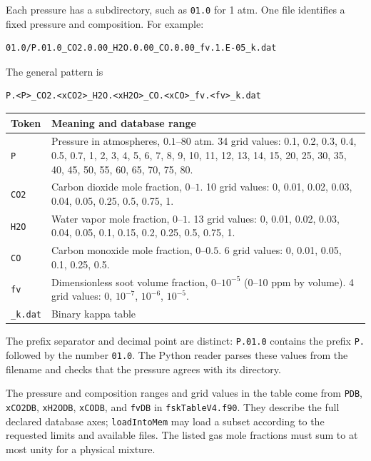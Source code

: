 \documentclass[11pt,letterpaper]{article}
\begin{document}
Each pressure has a subdirectory, such as \texttt{01.0} for 1 atm.
One file identifies a fixed pressure and composition. For example:
\begin{lstlisting}
01.0/P.01.0_CO2.0.00_H2O.0.00_CO.0.00_fv.1.E-05_k.dat
\end{lstlisting}
The general pattern is
\begin{lstlisting}
P.<P>_CO2.<xCO2>_H2O.<xH2O>_CO.<xCO>_fv.<fv>_k.dat
\end{lstlisting}
\begin{center}
\begin{tabularx}{\linewidth}{@{}l X@{}}
\toprule
Token & Meaning and database range \\
\midrule
\texttt{P} & Pressure in atmospheres, $0.1$--$80$ atm.
34 grid values: 0.1, 0.2, 0.3, 0.4, 0.5, 0.7, 1, 2, 3, 4, 5, 6, 7,
8, 9, 10, 11, 12, 13, 14, 15, 20, 25, 30, 35, 40, 45, 50, 55, 60,
65, 70, 75, 80. \\
\addlinespace
\texttt{CO2} & Carbon dioxide mole fraction, $0$--$1$.
10 grid values: 0, 0.01, 0.02, 0.03, 0.04, 0.05, 0.25, 0.5, 0.75, 1. \\
\addlinespace
\texttt{H2O} & Water vapor mole fraction, $0$--$1$.
13 grid values: 0, 0.01, 0.02, 0.03, 0.04, 0.05, 0.1, 0.15, 0.2, 0.25,
0.5, 0.75, 1. \\
\addlinespace
\texttt{CO} & Carbon monoxide mole fraction, $0$--$0.5$.
6 grid values: 0, 0.01, 0.05, 0.1, 0.25, 0.5. \\
\addlinespace
\texttt{fv} & Dimensionless soot volume fraction,
$0$--$10^{-5}$ (0--10 ppm by volume).
4 grid values: $0$, $10^{-7}$, $10^{-6}$, $10^{-5}$. \\
\addlinespace
\texttt{\_k.dat} & Binary kappa table \\
\bottomrule
\end{tabularx}
\end{center}
The prefix separator and decimal point are distinct: \texttt{P.01.0}
contains the prefix \texttt{P.} followed by the number \texttt{01.0}.
The Python reader parses these values from the filename and checks that the
pressure agrees with its directory.

The pressure and composition ranges and grid values in the table come from
\texttt{PDB}, \texttt{xCO2DB}, \texttt{xH2ODB}, \texttt{xCODB}, and \texttt{fvDB} in
\texttt{fskTableV4.f90}. They describe the full declared database axes;
\texttt{loadIntoMem} may load a subset according to the requested limits and
available files. The listed gas mole fractions must sum to at most unity
for a physical mixture.
\end{document}
